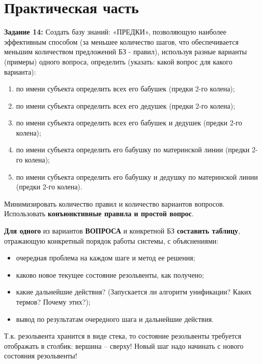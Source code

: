 \chapter{Практическая часть}

\textbf{Задание 14:} Создать базу знаний: «ПРЕДКИ», позволяющую наиболее эффективным способом (за меньшее количество шагов, что обеспечивается меньшим количеством предложений БЗ - правил), используя разные варианты (примеры) одного вопроса, определить (указать: какой вопрос для какого варианта):

\begin{enumerate}
    \item по имени субъекта определить всех его бабушек (предки 2-го колена);
    \item по имени субъекта определить всех его дедушек (предки 2-го колена);
    \item по имени субъекта определить всех его бабушек и дедушек (предки 2-го колена);
    \item по имени субъекта определить его бабушку по материнской линии (предки 2-го колена);
    \item по имени субъекта определить его бабушку и дедушку по материнской линии (предки 2-го колена).
\end{enumerate}

Минимизировать количество правил и количество вариантов вопросов. Использовать \textbf{конъюнктивные правила и простой вопрос}.

\textbf{Для одного} из вариантов \textbf{ВОПРОСА} и конкретной БЗ \textbf{составить таблицу},
отражающую конкретный порядок работы системы, с объяснениями:
\begin{itemize}
    \item очередная проблема на каждом шаге и метод ее решения;
    \item каково новое текущее состояние резольвенты, как получено;
    \item какие дальнейшие действия? (Запускается ли алгоритм унификации? Каких термов? Почему этих?);
    \item вывод по результатам очередного шага и дальнейшие действия.
\end{itemize}

Т.к. резольвента хранится в виде стека, то состояние резольвенты требуется отображать в столбик: вершина -- сверху! Новый шаг надо начинать с нового состояния резольвенты!

\clearpage


